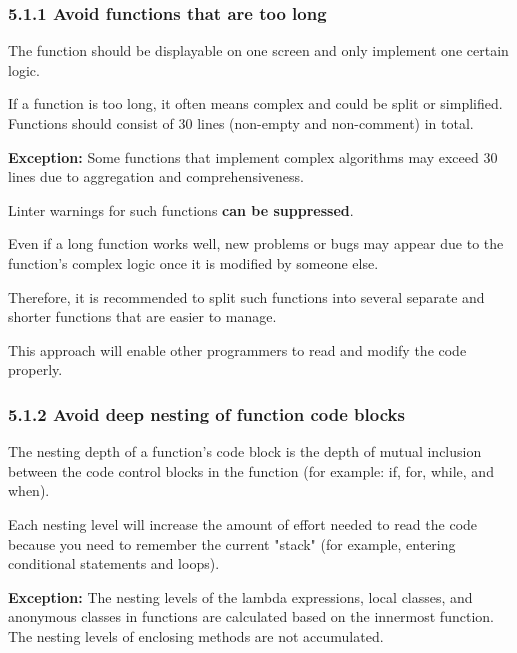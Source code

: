 {{{{\subsubsection*{\textbf{5.1.1 Avoid functions that are too long}}
\leavevmode\newline



The function should be displayable on one screen and only implement one certain logic.

If a function is too long, it often means complex and could be split or simplified. Functions should consist of 30 lines (non-empty and non-comment) in total.



\textbf{Exception:} Some functions that implement complex algorithms may exceed 30 lines due to aggregation and comprehensiveness.

Linter warnings for such functions \textbf{can be suppressed}. 



Even if a long function works well, new problems or bugs may appear due to the function's complex logic once it is modified by someone else.

Therefore, it is recommended to split such functions into several separate and shorter functions that are easier to manage.

This approach will enable other programmers to read and modify the code properly.

\subsubsection*{\textbf{5.1.2 Avoid deep nesting of function code blocks}}
\leavevmode\newline



The nesting depth of a function's code block is the depth of mutual inclusion between the code control blocks in the function (for example: if, for, while, and when).

Each nesting level will increase the amount of effort needed to read the code because you need to remember the current "stack" (for example, entering conditional statements and loops). 

\textbf{Exception:} The nesting levels of the lambda expressions, local classes, and anonymous classes in functions are calculated based on the innermost function. The nesting levels of enclosing methods are not accumulated.

}}}}

